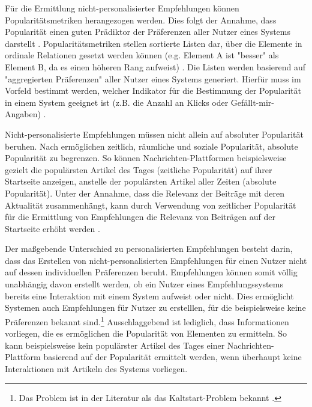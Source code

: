 Für die Ermittlung nicht-personalisierter Empfehlungen können Popularitätsmetriken herangezogen werden.
Dies folgt der Annahme, dass Popularität einen guten Prädiktor der Präferenzen aller Nutzer eines Systems darstellt \cite[S. 406]{unternährer:article}.
Popularitätsmetriken stellen sortierte Listen dar, über die Elemente in ordinale Relationen gesetzt werden können (e.g. Element A ist "besser" als Element B, da es einen höheren Rang aufweist) \cite[S. 404ff]{unternährer:article}.
Die Listen werden basierend auf "aggregierten Präferenzen" aller Nutzer eines Systems generiert.
Hierfür muss im Vorfeld bestimmt werden, welcher Indikator für die Bestimmung der Popularität in einem System geeignet ist (z.B. die Anzahl an Klicks oder Gefällt-mir-Angaben) \cite[S. 406]{unternährer:article}.

Nicht-personalisierte Empfehlungen müssen nicht allein auf absoluter Popularität beruhen.
Nach \textcite[S. 405]{unternährer:article} ermöglichen zeitlich, räumliche und soziale Popularität, absolute Popularität zu begrenzen.
So können Nachrichten-Plattformen beispielsweise gezielt die populärsten Artikel des Tages (zeitliche Popularität) auf ihrer Startseite anzeigen, anstelle der populärsten Artikel aller Zeiten (absolute Popularität).
Unter der Annahme, dass die Relevanz der Beiträge mit deren Aktualität zusammenhängt, kann durch Verwendung von zeitlicher Popularität für die Ermittlung von Empfehlungen die Relevanz von Beiträgen auf der Startseite erhöht werden \cite[S. 405]{unternährer:article}.

Der maßgebende Unterschied zu personalisierten Empfehlungen besteht darin, dass das Erstellen von nicht-personalisierten Empfehlungen für einen Nutzer nicht auf dessen individuellen Präferenzen beruht.
Empfehlungen können somit völlig unabhängig davon erstellt werden, ob ein Nutzer eines Empfehlungssystems bereits eine Interaktion mit einem System aufweist oder nicht.
Dies ermöglicht Systemen auch Empfehlungen für Nutzer zu erstelllen, für die beispielsweise keine Präferenzen bekannt sind.\footnote{Das Problem ist in der Literatur als das Kaltstart-Problem bekannt \cite[S. 407]{unternährer:article}.}
Ausschlaggebend ist lediglich, dass Informationen vorliegen, die es ermöglichen die Popularität von Elementen zu ermitteln.
So kann beispielsweise kein populärster Artikel des Tages einer Nachrichten-Plattform basierend auf der Popularität ermittelt werden, wenn überhaupt keine Interaktionen mit Artikeln des Systems vorliegen.

